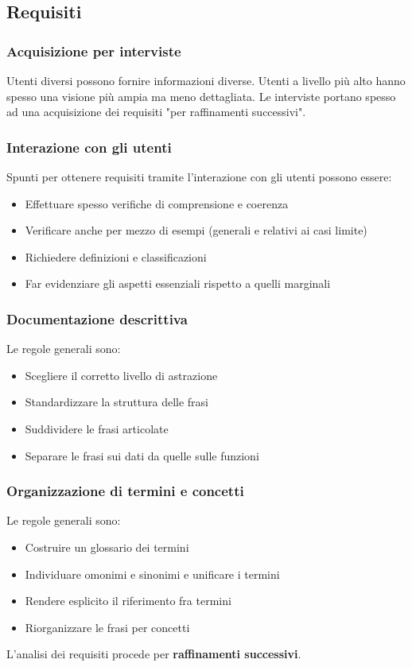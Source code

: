 \documentclass[12pt]{article}
\begin{document}
\subsection{Requisiti}
\subsubsection{Acquisizione per interviste}
Utenti diversi possono fornire informazioni diverse.
Utenti a livello più alto hanno spesso una visione più ampia ma meno dettagliata.
Le interviste portano spesso ad una acquisizione dei requisiti "per raffinamenti successivi".
\subsubsection{Interazione con gli utenti}
Spunti per ottenere requisiti tramite l'interazione con gli utenti possono essere:
\begin{itemize}
    \item Effettuare spesso verifiche di comprensione e coerenza
    \item Verificare anche per mezzo di esempi (generali e relativi ai casi limite)
    \item Richiedere definizioni e classificazioni
    \item Far evidenziare gli aspetti essenziali rispetto a quelli marginali
\end{itemize}
\subsubsection{Documentazione descrittiva}
Le regole generali sono:
\begin{itemize}
    \item Scegliere il corretto livello di astrazione
    \item Standardizzare la struttura delle frasi
    \item Suddividere le frasi articolate
    \item Separare le frasi sui dati da quelle sulle funzioni
\end{itemize}
\subsubsection{Organizzazione di termini e concetti}
Le regole generali sono:
\begin{itemize}
    \item Costruire un glossario dei termini
    \item Individuare omonimi e sinonimi e unificare i termini
    \item Rendere esplicito il riferimento fra termini
    \item Riorganizzare le frasi per concetti
\end{itemize}
L'analisi dei requisiti procede per \textbf{raffinamenti successivi}.
\end{document}
